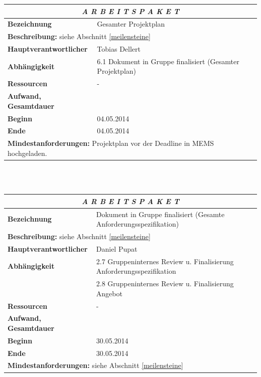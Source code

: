 \documentclass[fontsize=12pt,paper=a4,twoside]{scrartcl}
\begin{document}
\begin{tabular}{p{7.5cm}|p{7.5cm}}\toprule
\multicolumn{2}{c}{\textbf{\textit{A R B E I T S P A K E T \quad 5.2}}} \\ \toprule \hline
\textbf{Bezeichnung} & Gesamter Projektplan\\\hline
\multicolumn{2}{p{15cm}}{\textbf{Beschreibung:} \newline 
siehe Abschnitt \ref{meilensteine} }  \\\hline
\textbf{Hauptverantwortlicher} & Tobias Dellert \\\hline
\textbf{Abhängigkeit} & 6.1 Dokument in Gruppe finalisiert (Gesamter Projektplan)\\\hline
\textbf{Ressourcen} & -\\\hline
\textbf{Aufwand, Gesamtdauer} & \\\hline
\textbf{Beginn} & 04.05.2014 \\\hline
\textbf{Ende} & 04.05.2014\\\hline
\multicolumn{2}{p{15cm}}{\textbf{Mindestanforderungen: } \newline
Projektplan vor der Deadline in MEMS hochgeladen.}  \\ \toprule
\end{tabular} \\\\

\begin{tabular}{p{7.5cm}|p{7.5cm}}\toprule
\multicolumn{2}{c}{\textbf{\textit{A R B E I T S P A K E T \quad 5.3}}} \\ \toprule \hline
\textbf{Bezeichnung} & Dokument in Gruppe finalisiert (Gesamte Anforderungsspezifikation)\\\hline
\multicolumn{2}{p{15cm}}{\textbf{Beschreibung:} \newline 
siehe Abschnitt \ref{meilensteine} }  \\\hline
\textbf{Hauptverantwortlicher} & Daniel Pupat \\\hline
\textbf{Abhängigkeit} & 2.7 Gruppeninternes Review u. Finalisierung Anforderungsspezifikation \\
& 2.8 Gruppeninternes Review u. Finalisierung Angebot\\\hline
\textbf{Ressourcen} & -\\\hline
\textbf{Aufwand, Gesamtdauer} & \\\hline
\textbf{Beginn} & 30.05.2014 \\\hline
\textbf{Ende} & 30.05.2014\\\hline
\multicolumn{2}{p{15cm}}{\textbf{Mindestanforderungen: } \newline
siehe Abschnitt \ref{meilensteine}}  \\ \toprule
\end{tabular} \\\\
\end{document}

